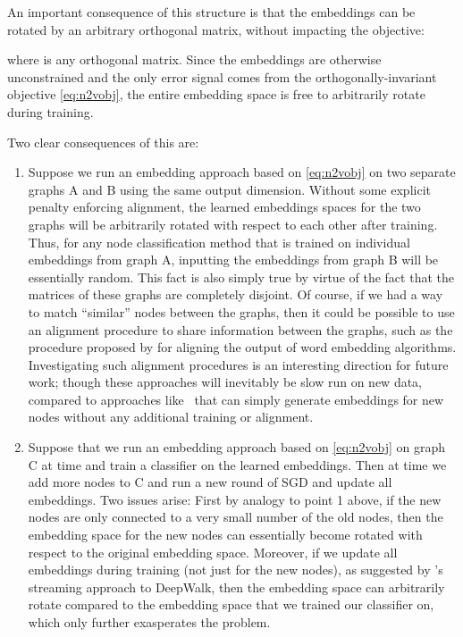 An important consequence of this structure is that the embeddings can be rotated by an arbitrary orthogonal matrix, without impacting the objective:

where  is any orthogonal matrix. 
Since the embeddings are otherwise unconstrained and the only error signal comes from the orthogonally-invariant objective \eqref{eq:n2vobj}, the entire embedding space is free to arbitrarily rotate during training.  

Two clear consequences of this are:
\begin{enumerate}
\item
	Suppose we run an embedding approach based on \eqref{eq:n2vobj} on two separate graphs A and B using the same output dimension. Without some explicit penalty enforcing alignment, the learned embeddings spaces for the two graphs will be arbitrarily rotated with respect to each other after training. 
	Thus, for any node classification method that is trained on individual embeddings from graph A, inputting the embeddings from graph B will be essentially random. 
	This fact is also simply true by virtue of the fact that the  matrices of these graphs are completely disjoint. 
	Of course, if we had a way to match ``similar'' nodes between the graphs, then it could be possible to use an alignment procedure to share information between the graphs, such as the procedure proposed by \cite{hamilton2016diachronic} for aligning the output of word embedding algorithms. 
	Investigating such alignment procedures is an interesting direction for future work; though these approaches will inevitably be slow run on new data, compared to approaches like \name\ that can simply generate embeddings for new nodes without any additional training or alignment. 
\item
  Suppose that we run an embedding approach based on \eqref{eq:n2vobj} on graph C at time  and train a classifier on the learned embeddings. Then at time  we add more nodes to C and run a new round of SGD and update all embeddings.
  Two issues arise: First by analogy to point 1 above, if the new nodes are only connected to a very small number of the old nodes, then the embedding space for the new nodes can essentially become rotated with respect to the original embedding space.
  Moreover, if we update all embeddings during training (not just for the new nodes), as suggested by \cite{perozzi2014deepwalk}'s streaming approach to DeepWalk, then the embedding space can arbitrarily rotate compared to the embedding space that we trained our classifier on, which only further exasperates the problem.  
\end{enumerate}

